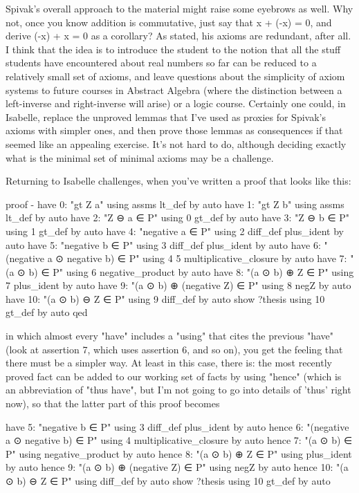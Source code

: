 Spivak's overall approach to the material might raise some eyebrows as well. Why not, once you know addition is commutative, just say that x + (-x) = 0, and derive (-x) + x = 0 as a corollary? As stated, his axioms are redundant, after all. I think that the idea is to introduce the student to the notion that all the stuff students have encountered about real numbers so far can be reduced to a relatively small set of axioms, and leave questions about the simplicity of axiom systems to future courses in Abstract Algebra (where the distinction between a left-inverse and right-inverse will arise) or a logic course. Certainly one could, in Isabelle, replace the unproved lemmas that I've used as proxies for Spivak's axioms with simpler ones, and then prove those lemmas as consequences if that seemed like an appealing exercise. It's not hard to do, although deciding exactly what is the minimal set of minimal axioms may be a challenge. 

Returning to Isabelle challenges, when you've written a proof that looks like this:

proof -
  have 0: "gt Z a" using assms lt_def by auto
  have 1: "gt Z b" using assms lt_def by auto
  have 2: "Z  ⊖  a ∈ P" using 0 gt_def by auto
  have 3: "Z  ⊖  b ∈ P" using 1 gt_def by auto
  have 4: "negative a ∈ P" using 2 diff_def plus_ident by auto
  have 5: "negative b ∈ P" using 3 diff_def plus_ident by auto
  have 6: "(negative a  ⊙  negative b) ∈ P" 
    using 4 5 multiplicative_closure  by auto
  have 7:  "(a  ⊙  b) ∈ P" using 6 negative_product by auto
  have 8:  "(a  ⊙  b) ⊕ Z ∈ P" using 7 plus_ident by auto
  have 9:  "(a  ⊙  b) ⊕ (negative Z) ∈ P" using 8 negZ by auto
  have 10:  "(a  ⊙  b)  ⊖  Z ∈ P" using 9 diff_def by auto
  show ?thesis using 10 gt_def by auto 
qed

in which almost every "have" includes a "using" that cites the previous "have"  (look at assertion 7, which uses assertion 6, and so on), you get the feeling that there must be a simpler way. At least in this case, there is: the most recently proved fact can be added to our working set of facts by using "hence" (which is an abbreviation of "thus have", but I'm not going to go into details of 'thus' right now), so that the latter part of this proof becomes

  have 5: "negative b ∈ P" using 3 diff_def plus_ident by auto
  hence 6: "(negative a  ⊙  negative b) ∈ P"  using 4  multiplicative_closure  by auto
  hence 7:  "(a  ⊙  b) ∈ P" using negative_product by auto
  hence 8:  "(a  ⊙  b) ⊕ Z ∈ P" using plus_ident by auto
  hence 9:  "(a  ⊙  b) ⊕ (negative Z) ∈ P" using negZ by auto
  hence 10:  "(a  ⊙  b)  ⊖  Z ∈ P" using diff_def by auto
  show ?thesis using 10 gt_def by auto 

